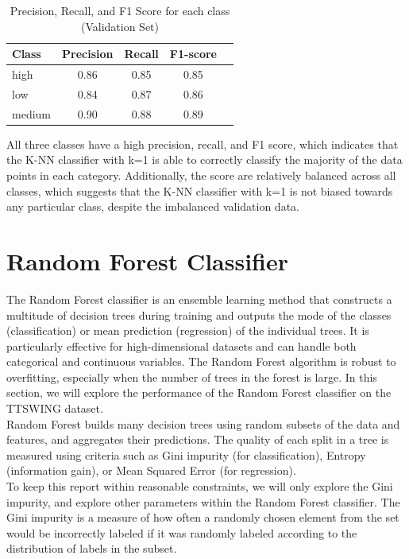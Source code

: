 \documentclass[12pt]{article}
\begin{document}
\begin{table}[H]
\centering
\caption{Precision, Recall, and F1 Score for each class (Validation Set)}
\label{tab:knn_prf1}
\begin{tabular}{lcccc}
\toprule
Class      & Precision & Recall & F1-score \\
\midrule
high       & 0.86      & 0.85   & 0.85     \\
low        & 0.84      & 0.87   & 0.86     \\
medium     & 0.90      & 0.88   & 0.89     \\
\bottomrule
\end{tabular}
\end{table}

All three classes have a high precision, recall, and F1 score, which indicates that the K-NN classifier with k=1 is able to correctly classify the majority of the data points in each category. Additionally, the score are relatively balanced across all classes, which suggests that the K-NN classifier with k=1 is not biased towards any particular class, despite the imbalanced validation data.


\vspace{20pt}

\section{Random Forest Classifier}
\noindent
The Random Forest classifier is an ensemble learning method that constructs a multitude of decision trees during training and outputs the mode of the classes (classification) or mean prediction (regression) of the individual trees. It is particularly effective for high-dimensional datasets and can handle both categorical and continuous variables. The Random Forest algorithm is robust to overfitting, especially when the number of trees in the forest is large. In this section, we will explore the performance of the Random Forest classifier on the TTSWING dataset.
\\
Random Forest builds many decision trees using random subsets of the data and features, and aggregates their predictions. The quality of each split in a tree is measured using criteria such as Gini impurity (for classification), Entropy (information gain), or Mean Squared Error (for regression). 
\\
To keep this report within reasonable constraints, we will only explore the Gini impurity, and explore other parameters within the Random Forest classifier. The Gini impurity is a measure of how often a randomly chosen element from the set would be incorrectly labeled if it was randomly labeled according to the distribution of labels in the subset. 
\end{document}
